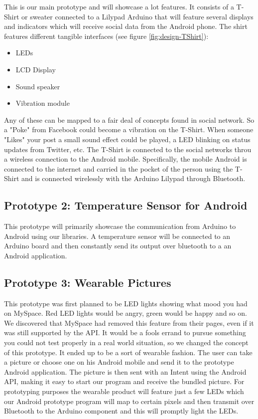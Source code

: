 This is our main prototype and will showcase a lot features.
It consists of a T-Shirt or sweater connected to a Lilypad Arduino that will feature
several displays and indicators which will receive social data from the Android phone.
The shirt features different tangible interfaces (see figure \ref{fig:design-TShirt}):
	
\begin{itemize}
\item LEDs
\item LCD Display
\item Sound speaker
\item Vibration module
\end{itemize}
	
Any of these can be mapped to a fair deal of concepts found in social network.
So a "Poke" from Facebook could become a vibration on the T-Shirt. When someone "Likes" your post a small sound effect
could be played, a LED blinking on status updates from Twitter, etc. The T-Shirt is connected to the social networks
throu a wireless connection to the Android mobile. Specifically, the mobile Android is connected to the internet
and carried in the pocket of the person using the T-Shirt and is connected wirelessly with the Arduino Lilypad through Bluetooth.
	

\newpage
	
\subsection{Prototype 2: Temperature Sensor for Android}
This prototype will primarily showcase the communication from Arduino to Android using our libraries.
A temperature sensor will be connected to an Arduino board and then constantly send its output over bluetooth to a
an Android application.
	
\subsection{Prototype 3: Wearable Pictures}
This prototype was first planned to be LED lights showing what mood you had on MySpace. Red LED lights would be angry,
green would be happy and so on. We discovered that MySpace had removed this feature from their pages, even if it was
still supported by the API. It would be a fools errand to pursue something you could not test properly
in a real world situation, so we changed the concept of this prototype. It ended up to be a sort of wearable fashion.
The user can take a picture or choose one on his Android mobile and send it to the prototype Android application.
The picture is then sent with an Intent using the Android API, making it easy to start our program and receive
the bundled picture. For prototyping purposes the wearable product will feature just a few LEDs which our Android
prototype program will map to certain pixels and then transmit over Bluetooth to the Arduino
component and this will promptly light the LEDs.

